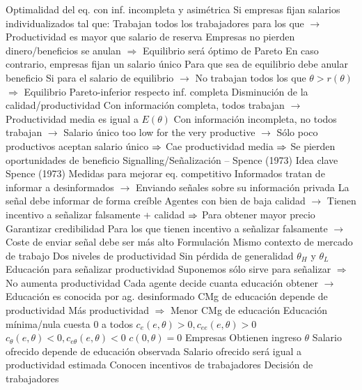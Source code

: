 \documentclass{nuevotema}
\begin{document}
\begin{esquemal}
			\3 Optimalidad del eq. con inf. incompleta y asimétrica
				\4 Si empresas fijan salarios individualizados tal que:
				\4[] Trabajan todos los trabajadores para los que
				\4[] $\to$ Productividad es mayor que salario de reserva
				\4[] Empresas no pierden dinero/beneficios se anulan
				\4[] $\Rightarrow$ Equilibrio será óptimo de Pareto
				\4 En caso contrario, empresas fijan un salario único
				\4[] Para que sea de equilibrio debe anular beneficio
				\4[] Si para el salario de equilibrio
				\4[] $\to$ No trabajan todos los que $\theta > r(\theta)$
				\4[] $\Rightarrow$ Equilibrio Pareto-inferior respecto inf. completa
				\4 Disminución de la calidad/productividad
				\4[] Con información completa, todos trabajan
				\4[] $\to$ Productividad media es igual a $E(\theta)$
				\4[] Con información incompleta, no todos trabajan
				\4[] $\to$ Salario único too low for the very productive
				\4[] $\to$ Sólo poco productivos aceptan salario único
				\4[] $\Rightarrow$ Cae productividad media
				\4[] $\Rightarrow$ Se pierden oportunidades de beneficio
		\2 Signalling/Señalización -- Spence (1973)
			\3 Idea clave
				\4 Spence (1973)
				\4 Medidas para mejorar eq. competitivo
				\4[] Informados tratan de informar a desinformados
				\4[] $\to$ Enviando señales sobre su información privada
				\4 La señal debe informar de forma creíble
				\4[] Agentes con bien de baja calidad
				\4[] $\to$ Tienen incentivo a señalizar falsamente + calidad
				\4[] $\Rightarrow$ Para obtener mayor precio
				\4 Garantizar credibilidad
				\4[] Para los que tienen incentivo a señalizar falsamente
				\4[] $\to$ Coste de enviar señal debe ser más alto
			\3 Formulación
				\4 Mismo contexto de mercado de trabajo
				\4 Dos niveles de productividad
				\4[] Sin pérdida de generalidad
				\4[] $\theta_H$ y $\theta_L$
				\4 Educación para señalizar productividad
				\4[] Suponemos sólo sirve para señalizar
				\4[] $\Rightarrow$ No aumenta productividad
				\4[] Cada agente decide cuanta educación obtener
				\4[] $\to$ Educación es conocida por ag. desinformado
				\4 CMg de educación depende de productividad
				\4[] Más productividad $\Rightarrow$ Menor CMg de educación
				\4[] Educación mínima/nula cuesta 0 a todos
				\4[] $c_e(e, \theta) > 0, c_{ee}(e,\theta) > 0$
				\4[] $c_\theta (e,\theta) < 0, c_{e\theta}(e,\theta) < 0$
				\4[] $c(0, \theta) = 0$
				\4 Empresas
				\4[] Obtienen ingreso $\theta$
				\4[] Salario ofrecido depende de educación observada
				\4[] Salario ofrecido será igual a productividad estimada
				\4[] Conocen incentivos de trabajadores
				\4 Decisión de trabajadores

\end{esquemal}
\end{document}
